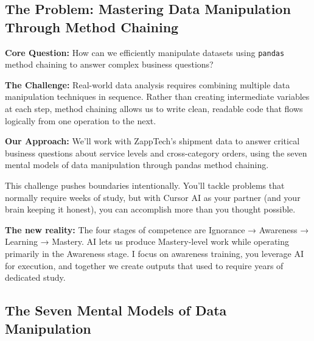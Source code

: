 \documentclass[
  letterpaper,
  DIV=11,
  numbers=noendperiod]{scrartcl}
\begin{document}
\subsection{The Problem: Mastering Data Manipulation Through Method
Chaining}\label{the-problem-mastering-data-manipulation-through-method-chaining}

\textbf{Core Question:} How can we efficiently manipulate datasets using
\texttt{pandas} method chaining to answer complex business questions?

\textbf{The Challenge:} Real-world data analysis requires combining
multiple data manipulation techniques in sequence. Rather than creating
intermediate variables at each step, method chaining allows us to write
clean, readable code that flows logically from one operation to the
next.

\textbf{Our Approach:} We'll work with ZappTech's shipment data to
answer critical business questions about service levels and
cross-category orders, using the seven mental models of data
manipulation through pandas method chaining.

\begin{tcolorbox}[enhanced jigsaw, bottomtitle=1mm, opacitybacktitle=0.6, toptitle=1mm, colbacktitle=quarto-callout-warning-color!10!white, breakable, coltitle=black, bottomrule=.15mm, left=2mm, colframe=quarto-callout-warning-color-frame, colback=white, title=\textcolor{quarto-callout-warning-color}{\faExclamationTriangle}\hspace{0.5em}{⚠️ AI Partnership Required}, leftrule=.75mm, arc=.35mm, rightrule=.15mm, opacityback=0, toprule=.15mm, titlerule=0mm]

This challenge pushes boundaries intentionally. You'll tackle problems
that normally require weeks of study, but with Cursor AI as your partner
(and your brain keeping it honest), you can accomplish more than you
thought possible.

\textbf{The new reality:} The four stages of competence are Ignorance →
Awareness → Learning → Mastery. AI lets us produce Mastery-level work
while operating primarily in the Awareness stage. I focus on awareness
training, you leverage AI for execution, and together we create outputs
that used to require years of dedicated study.

\end{tcolorbox}

\subsection{The Seven Mental Models of Data
Manipulation}\label{the-seven-mental-models-of-data-manipulation}
\end{document}
